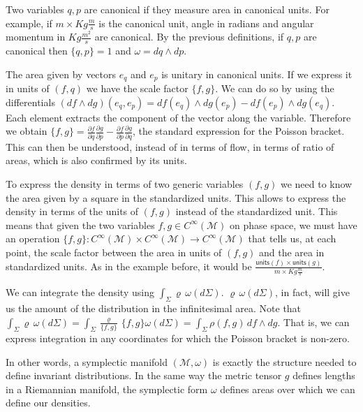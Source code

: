 \documentclass[smallextended]{svjour3}
\numberwithin{equation}{section}
\theoremstyle{definition}
\begin{document}
Two variables $q,p$ are canonical if they measure area in canonical units. For example, if $m \times Kg \frac{m}{s}$ is the canonical unit, angle in radians and angular momentum in $Kg \frac{m^2}{s}$ are canonical. By the previous definitions, if $q,p$ are canonical then $\{ q , p \} = 1$ and $\omega = dq \wedge dp$.

The area given by vectors $e_q$ and $e_p$ is unitary in canonical units. If we express it in units of $(f,q)$ we have the scale factor $\{ f , g \}$. We can do so by using the differentials $(df\wedge dg) (e_q, e_p) = df(e_q)\wedge dg(e_p) - df(e_p)\wedge dg(e_q)$. Each element extracts the component of the vector along the variable. Therefore we obtain $\{ f , g \} = \frac{\partial f}{\partial q} \frac{\partial g}{\partial p}- \frac{\partial f}{\partial p} \frac{\partial g}{\partial q}$, the standard expression for the Poisson bracket. This can then be understood, instead of in terms of flow, in terms of ratio of areas, which is also confirmed by its units.

To express the density in terms of two generic variables $(f, g)$ we need to know the area given by a square in the standardized units. This allows to express the density in terms of the units of $(f, g)$ instead of the standardized unit. This means that given the two variables $f,g \in C^\infty(\mathcal{M})$ on phase space, we must have an operation $\{ f , g \} : C^\infty(\mathcal{M}) \times C^\infty(\mathcal{M}) \rightarrow C^\infty(\mathcal{M})$ that tells us, at each point, the scale factor between the area in units of $(f,g)$ and the area in standardized units. As in the example before, it would be $\frac{\textsf{units}(f) \times \textsf{units}(g)}{m \times Kg \frac{m}{s}}$.

We can integrate the density using $\int_{\Sigma}\varrho \, \omega(d\Sigma)$. $\varrho \, \omega(d\Sigma)$, in fact, will give us the amount of the distribution in the infinitesimal area. Note that $\int_{\Sigma}\varrho \, \omega(d\Sigma) = \int_{\Sigma}\frac{\varrho}{\{f,g\}} \, \{f,g\} \omega(d\Sigma) =\int_{\Sigma}\rho(f,g) \, df\wedge dg$. That is, we can express integration in any coordinates for which the Poisson bracket is non-zero.

In other words, a symplectic manifold $(\mathcal{M}, \omega)$ is exactly the structure needed to define invariant distributions. In the same way the metric tensor $g$ defines lengths in a Riemannian manifold, the symplectic form $\omega$ defines areas over which we can define our densities.
\end{document}

